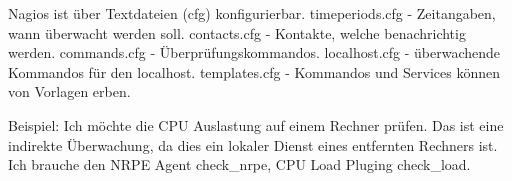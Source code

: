 Nagios ist über Textdateien (cfg) konfigurierbar. timeperiods.cfg - Zeitangaben, wann überwacht werden soll. contacts.cfg - Kontakte, welche benachrichtig werden. commands.cfg - Überprüfungskommandos. localhost.cfg - überwachende Kommandos für den localhost. templates.cfg - Kommandos und Services können von Vorlagen erben.

Beispiel: Ich möchte die CPU Auslastung auf einem Rechner prüfen. Das ist eine indirekte Überwachung, da dies ein lokaler Dienst eines entfernten Rechners ist. Ich brauche den NRPE Agent check\_nrpe, CPU Load Pluging check\_load. 